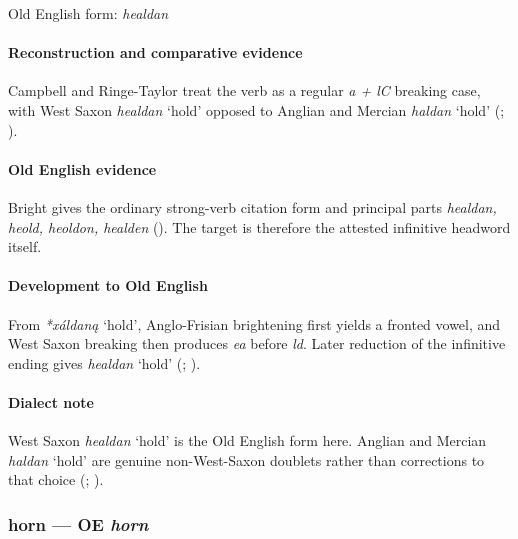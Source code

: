 \documentclass[
  british,
  a4paper,
]{article}
\providecommand{\Recon}[1]{\emph{*#1}}
\begin{document}
Old English form: \emph{healdan}

\paragraph{Reconstruction and comparative
evidence}\label{reconstruction-and-comparative-evidence-38}

Campbell and Ringe-Taylor treat the verb as a regular \emph{a + lC}
breaking case, with West Saxon {\emph{healdan}} `hold' opposed to
Anglian and Mercian {\emph{haldan}} `hold'
(;
).

\paragraph{Old English evidence}\label{old-english-evidence-39}

Bright gives the ordinary strong-verb citation form and principal parts
\emph{healdan, heold, heoldon, healden}
(). The target is
therefore the attested infinitive headword itself.

\paragraph{Development to Old
English}\label{development-to-old-english-39}

From \Recon{xáldaną} `hold', Anglo-Frisian brightening first yields a
fronted vowel, and West Saxon breaking then produces \emph{ea} before
\emph{ld}. Later reduction of the infinitive ending gives
{\emph{healdan}} `hold' (;
).

\paragraph{Dialect note}\label{dialect-note-2}

West Saxon {\emph{healdan}} `hold' is the Old English form here. Anglian
and Mercian {\emph{haldan}} `hold' are genuine non-West-Saxon doublets
rather than corrections to that choice
(;
).

\subsubsection{\texorpdfstring{horn --- OE
\emph{horn}}{horn --- OE horn}}\label{horn-oe-horn}
\end{document}
